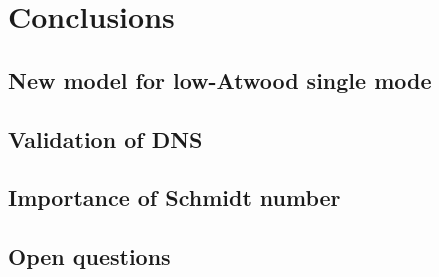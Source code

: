 \chapter{Conclusions}

\section{New model for low-Atwood single mode}

\section{Validation of DNS}

\section{Importance of Schmidt number}

\section{Open questions}

